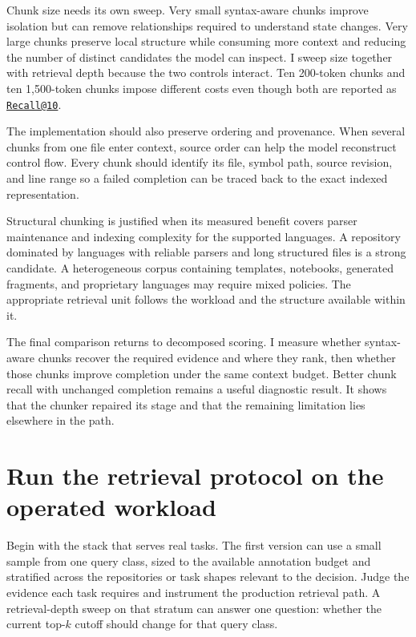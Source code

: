 Chunk size needs its own sweep. Very small syntax-aware chunks improve isolation but can remove relationships required to understand state changes. Very large chunks preserve local structure while consuming more context and reducing the number of distinct candidates the model can inspect. I sweep size together with retrieval depth because the two controls interact. Ten 200-token chunks and ten 1,500-token chunks impose different costs even though both are reported as \href{mailto:Recall@10}{\nolinkurl{Recall@10}}.

The implementation should also preserve ordering and provenance. When several chunks from one file enter context, source order can help the model reconstruct control flow. Every chunk should identify its file, symbol path, source revision, and line range so a failed completion can be traced back to the exact indexed representation.

Structural chunking is justified when its measured benefit covers parser maintenance and indexing complexity for the supported languages. A repository dominated by languages with reliable parsers and long structured files is a strong candidate. A heterogeneous corpus containing templates, notebooks, generated fragments, and proprietary languages may require mixed policies. The appropriate retrieval unit follows the workload and the structure available within it.

The final comparison returns to decomposed scoring. I measure whether syntax-aware chunks recover the required evidence and where they rank, then whether those chunks improve completion under the same context budget. Better chunk recall with unchanged completion remains a useful diagnostic result. It shows that the chunker repaired its stage and that the remaining limitation lies elsewhere in the path.

\section{Run the retrieval protocol on the operated workload}\label{run-the-retrieval-protocol-on-the-operated-workload}

Begin with the stack that serves real tasks. The first version can use a small sample from one query class, sized to the available annotation budget and stratified across the repositories or task shapes relevant to the decision. Judge the evidence each task requires and instrument the production retrieval path. A retrieval-depth sweep on that stratum can answer one question: whether the current top-\(k\) cutoff should change for that query class.

